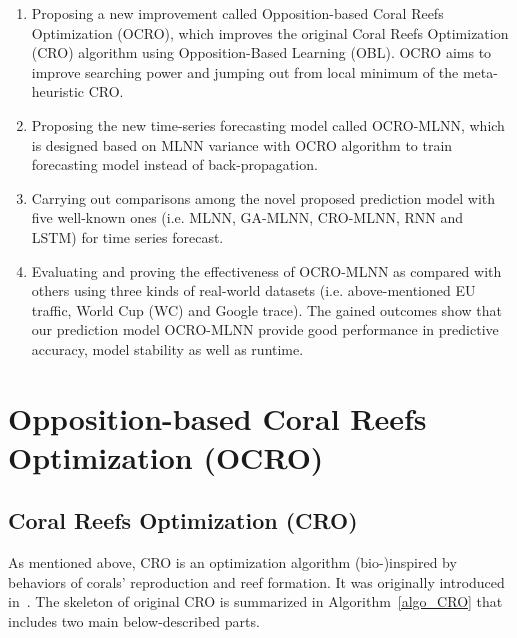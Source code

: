 \documentclass[smallcondensed, natbib]{svjour3}     %
\begin{document}
\begin{enumerate}
	\item Proposing a new improvement called Opposition-based Coral Reefs Optimization (OCRO), which improves the original Coral Reefs Optimization (CRO) algorithm using Opposition-Based Learning (OBL). OCRO aims to improve searching power and jumping out from local minimum of the meta-heuristic CRO.
	\item Proposing the new time-series forecasting model called OCRO-MLNN, which is designed based on MLNN variance with OCRO algorithm to train forecasting model instead of back-propagation. 
	\item Carrying out comparisons among the novel proposed prediction model with five well-known ones (i.e. MLNN, GA-MLNN, CRO-MLNN, RNN and LSTM) for time series forecast.
	\item Evaluating and proving the effectiveness of OCRO-MLNN as compared with others using three kinds of real-world datasets (i.e. above-mentioned EU traffic, World Cup (WC) and Google trace). The gained outcomes show that our prediction model OCRO-MLNN provide good performance in predictive accuracy, model stability as well as runtime.
\end{enumerate}

\section{Opposition-based Coral Reefs Optimization (OCRO)}
\label{ocro_mlnn}
\subsection{Coral Reefs Optimization (CRO)}
\label{cro}

As mentioned above, CRO is an optimization algorithm (bio-)inspired by behaviors of corals’ reproduction and reef formation. It was originally introduced in~\citep{ref_salcedo_sanz1}. The skeleton of original CRO is summarized in Algorithm~\ref{algo_CRO} that includes two main below-described parts.\\
\end{document}
